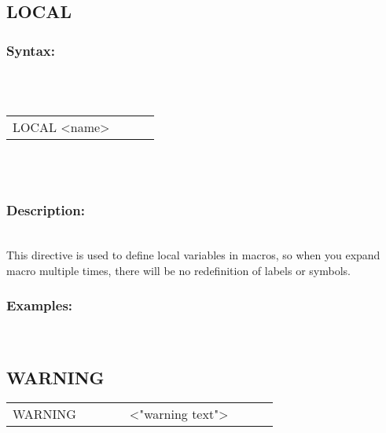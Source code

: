         \subsection{LOCAL}
        \subsubsection{Syntax:}\\
        \\ {
            \texttt{}
            \begin{tabular}[h!]{llll}
                    { \color{highlight_directive} LOCAL } { \color{highlight_symbol} <name> }
                    { \color{highlight_comment}  }\\
            \end{tabular}
            }\\
            \\
        \subsubsection{Description:}\\
        This directive is used to define local variables in macros, so when you expand macro multiple times, there will be no redefinition of labels
        or symbols.
        \subsubsection{Examples:}\\
                \begin{code}[h!]
                    directive}\verb'MACRO'}\verb'     '\verb'name_of_macro'\\
                    directive}\verb'LOCAL'}\verb`    `symbol}\verb'wait'}\\
                    directive}\verb'wait:'}\\
                    symbol}\verb'SUBCY        s0,#10h'}\\
                    symbol}\verb'SUB          s0,#1h' }\\
                    symbol}\verb'LOAD         s0,#F0h'}\\
                    symbol}\verb'JUMP         C,wait'}\\
                    directive}\verb'ENDM'}\\
                \end{code}

        \subsection{WARNING}
            {
            \texttt{}
            \begin{tabular}[h!]{llll}
                { \color{highlight_directive} WARNING }\verb`       `{ \color{highlight_string} <"warning text"> }
            \end{tabular}
            }\\
            \\
